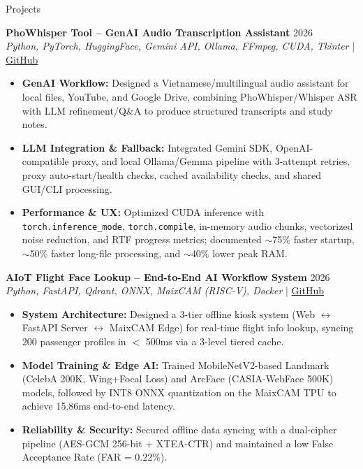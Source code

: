 \documentclass{resume}
\begin{document}
\begin{rSection}{Projects}
    \vspace{-0.6em}

    \item \textbf{PhoWhisper Tool -- GenAI Audio Transcription Assistant} \hfill 2026\\
    {\small \textit{Python, PyTorch, HuggingFace, Gemini API, Ollama, FFmpeg, CUDA, Tkinter}} \hfill | \href{https://github.com/pckienuit/phowhisper-tool}{GitHub}
    \begin{itemize}
        \itemsep 0pt {}
        \item \textbf{GenAI Workflow:} Designed a Vietnamese/multilingual audio assistant for local files, YouTube, and Google Drive, combining PhoWhisper/Whisper ASR with LLM refinement/Q\&A to produce structured transcripts and study notes.
        \item \textbf{LLM Integration \& Fallback:} Integrated Gemini SDK, OpenAI-compatible proxy, and local Ollama/Gemma pipeline with 3-attempt retries, proxy auto-start/health checks, cached availability checks, and shared GUI/CLI processing.
        \item \textbf{Performance \& UX:} Optimized CUDA inference with \texttt{torch.inference\_mode}, \texttt{torch.compile}, in-memory audio chunks, vectorized noise reduction, and RTF progress metrics; documented $\sim$75\% faster startup, $\sim$50\% faster long-file processing, and $\sim$40\% lower peak RAM.
    \end{itemize}

    \item \textbf{AIoT Flight Face Lookup -- End-to-End AI Workflow System} \hfill 2026\\
    {\small \textit{Python, FastAPI, Qdrant, ONNX, MaixCAM (RISC-V), Docker}} \hfill | \href{https://github.com/pckienuit/AIoT_DoAn}{GitHub}
    \begin{itemize}
        \itemsep 0pt {}
        \item \textbf{System Architecture:} Designed a 3-tier offline kiosk system (Web $\leftrightarrow$ FastAPI Server $\leftrightarrow$ MaixCAM Edge) for real-time flight info lookup, syncing 200 passenger profiles in $<$ 500ms via a 3-level tiered cache.
        \item \textbf{Model Training \& Edge AI:} Trained MobileNetV2-based Landmark (CelebA 200K, Wing+Focal Loss) and ArcFace (CASIA-WebFace 500K) models, followed by INT8 ONNX quantization on the MaixCAM TPU to achieve 15.86ms end-to-end latency.
        \item \textbf{Reliability \& Security:} Secured offline data syncing with a dual-cipher pipeline (AES-GCM 256-bit + XTEA-CTR) and maintained a low False Acceptance Rate (FAR = 0.22\%).
    \end{itemize}

\end{rSection}
\end{document}

